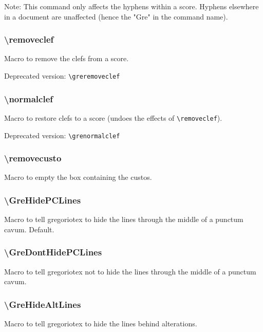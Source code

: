 Note: This command only affects the hyphens within a score.  Hyphens
elsewhere in a document are unaffected (hence the "Gre" in the command
name).

\subsubsection*{\textbackslash removeclef}
Macro to remove the clefs from a score.

\smallskip\hskip 15pt Deprecated version: \verb=\greremoveclef=

\subsubsection*{\textbackslash normalclef}
Macro to restore clefs to a score (undoes the effects of
\verb=\removeclef=).

\smallskip\hskip 15pt Deprecated version: \verb=\grenormalclef=

\subsubsection*{\textbackslash removecusto}
Macro to empty the box containing the custos.

\subsubsection*{\textbackslash GreHidePCLines}
Macro to tell gregoriotex to hide the lines through the middle of a
punctum cavum.  Default.

\subsubsection*{\textbackslash GreDontHidePCLines}
Macro to tell gregoriotex not to hide the lines through the middle of
a punctum cavum.

\subsubsection*{\textbackslash GreHideAltLines}	
Macro to tell gregoriotex to hide the lines behind alterations.

